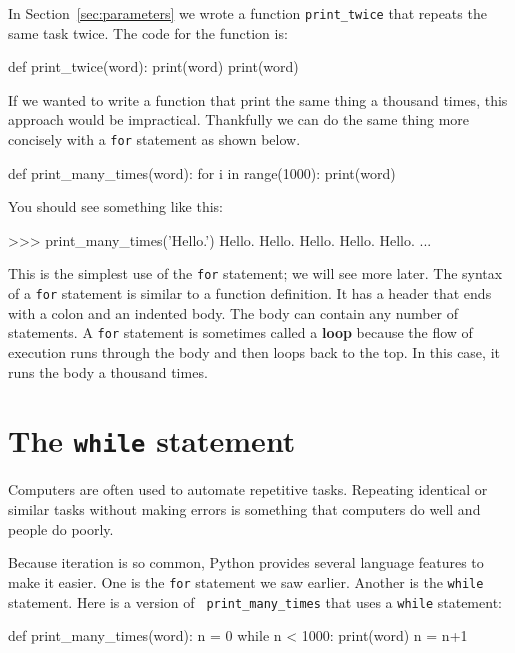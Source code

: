In Section~\ref{sec:parameters} we wrote a function \verb|print_twice| that repeats the same task twice. The code for the function is:

\beforeverb
\begin{pycode}
def print_twice(word):
    print(word)
    print(word)
\end{pycode}
\afterverb
%
If we wanted to write a function that print the same thing a thousand times, this
approach would be impractical. Thankfully we can do the same thing more concisely
with a {\tt for} statement as shown below. 


\beforeverb
\begin{pycode}
def print_many_times(word):
    for i in range(1000):
        print(word)
\end{pycode}
\afterverb
%
You should see something like this:

\beforeverb
\begin{pyinterpreter}
>>> print_many_times('Hello.')
Hello.
Hello.
Hello.
Hello.
Hello.
...
\end{pyinterpreter}
\afterverb
%
This is the simplest use of the {\tt for} statement; we will see
more later.  The syntax of a {\tt for} statement is similar to a function
definition.  It has a header that ends with a colon and an indented
body.  The body can contain any number of statements.
%
%
A {\tt for} statement is sometimes called a {\bf loop} because
the flow of execution runs through the body and then loops back
to the top.  In this case, it runs the body a thousand times.


\section{The {\tt while} statement}


Computers are often used to automate repetitive tasks.  Repeating
identical or similar tasks without making errors is something that
computers do well and people do poorly.

Because iteration is so common, Python provides several
language features to make it easier.  One is the {\tt for} statement
we saw earlier.  
Another is the {\tt while} statement.  Here is a version of {\tt
print\_many\_times} that uses a {\tt while} statement:

\beforeverb
\begin{pycode}
def print_many_times(word):
    n = 0
    while n < 1000:
        print(word)
        n = n+1
\end{pycode}
\afterverb

